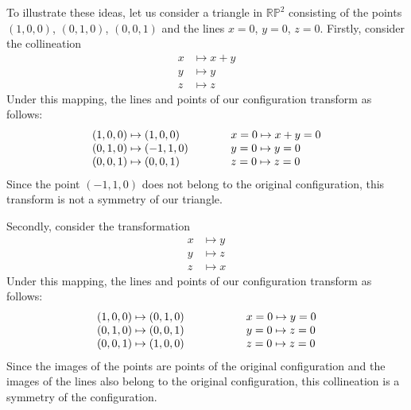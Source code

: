 \documentclass[12pt]{article}
\begin{document}
To illustrate these ideas, let us consider a triangle in $\mathbb{R}
\mathbb{P}^2$ consisting of the points $(1,0,0)$, $(0,1,0)$, $(0,0,1)$
and the lines $x = 0$, $y = 0$, $z = 0$.  Firstly, consider the 
collineation
\begin{align*}
 x &\mapsto x + y \\
 y &\mapsto y \\
 z &\mapsto z
\end{align*}
Under this mapping, the lines and points of our configuration 
transform as follows:
\[ \begin{matrix}
 (1,0,0) \mapsto (1,0,0) \hskip 0.5in \hfill & x = 0 \mapsto x + y = 0 \hfill \\
 (0,1,0) \mapsto (-1,1,0) \hfill & y = 0 \mapsto y = 0 \hfill \\
 (0,0,1) \mapsto (0,0,1) \hfill & z = 0 \mapsto z = 0 \hfill
\end{matrix} \]
Since the point $(-1,1,0)$ does not belong to the original configuration,
this transform is not a symmetry of our triangle.

Secondly, consider the transformation
\begin{align*}
 x &\mapsto y \\
 y &\mapsto z \\
 z &\mapsto x
\end{align*}
Under this mapping, the lines and points of our configuration 
transform as follows:
\[ \begin{matrix}
 (1,0,0) \mapsto (0,1,0) & \hskip 0.5in \hfill & x = 0 \mapsto y = 0 \hfill \\
 (0,1,0) \mapsto (0,0,1) & \hskip 0.5in \hfill & y = 0 \mapsto z = 0 \hfill \\
 (0,0,1) \mapsto (1,0,0) & \hskip 0.5in \hfill & z = 0 \mapsto z = 0 \hfill 
\end{matrix} \]
Since the images of the points are points of the original configuration and
the images of the lines also belong to the original configuration, this
collineation is a symmetry of the configuration.
\end{document}
